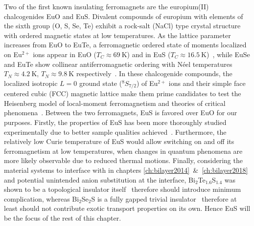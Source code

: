 Two of the first known insulating ferromagnets are the europium(II) chalcogenides EuO and EuS. Divalent compounds of europium with elements of the sixth group (O, S, Se, Te) exhibit a rock-salt (NaCl) type crystal structure with ordered magnetic states at low temperatures. As the lattice parameter increases from EuO to EuTe, a ferromagnetic ordered state of moments localized on Eu$^{2+}$ ions appear in EuO ($T_C\approx69~\mathrm{K}$) and in EuS ($T_C\approx16.5~\mathrm{K}$)~\cite{EuO_TC, EuS_Shafer, EuS_specific_heat}, while EuSe and EuTe show collinear antiferromagnetic ordering with N\'eel temperatures $T_N\approx4.2~\mathrm{K}$, $T_N\approx9.8~\mathrm{K}$ respectively~\cite{EuSe_AF, EuTe_AF}. In these chalcogenide compounds, the localized isotropic $L=0$ ground state ($^8S_{7/2}$) of Eu$^{2+}$ ions and their simple face centered cubic (FCC) magnetic lattice make them prime candidates to test the Heisenberg model of local-moment ferromagnetism and theories of critical phenomena~\cite{divalent_Eu, EuX_indirect_exchange, EuS_neighbor_exchange, EuS_critical, EuS_neutron, EuS_spin_wave}. Between the two ferromagnets, EuS is favored over EuO for our purposes. Firstly, the properties of EuS has been more thoroughly studied experimentally due to better sample qualities achieved~\cite{EuS_band_th2}. Furthermore, the relatively low Curie temperature of EuS would allow switching on and off its ferromagnetism at low temperatures, when changes in quantum phenomena are more likely observable due to reduced thermal motions. Finally, considering the material systems to interface with in chapters \ref{ch:bilayer2014}~\&~\ref{ch:bilayer2018} and potential unintended anion substitution at the interface, Bi$_2$Te$_{1.6}$S$_{1.4}$ was shown to be a topological insulator itself~\cite{BiTeS} therefore should introduce minimum complication, whereas Bi$_2$Se$_2$S is a fully gapped trivial insulator~\cite{BiSeS} therefore at least should not contribute exotic transport properties on its own. Hence EuS will be the focus of the rest of this chapter.

